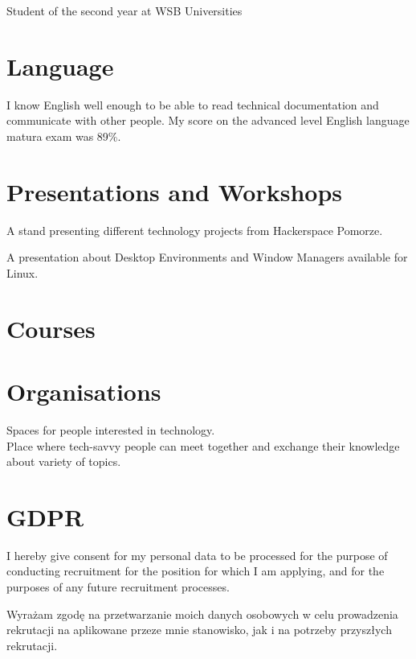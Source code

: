 \documentclass[11pt, a4paper, sans, colorlinks]{moderncv}
\begin{document}
{Student of the second year at WSB Universities}

\section{Language}

{I know English well enough to be able to read technical documentation and communicate with other people. My score on the advanced level English language matura exam was 89\%. }


\section{Presentations and Workshops}

{}{}
{A stand presenting different technology projects from Hackerspace Pomorze.}

{}{}
{A presentation about Desktop Environments and Window Managers available for Linux.}

\section{Courses}


\section{Organisations}

{
Spaces for people interested in technology.\\
Place where tech-savvy people can meet together and exchange their knowledge about variety of topics.
}

\section{GDPR}

{I hereby give consent for my personal data to be processed for the purpose of conducting recruitment for the position for which I am applying, and for the purposes of any future recruitment processes.}

{Wyrażam zgodę na przetwarzanie moich danych osobowych w celu prowadzenia rekrutacji na aplikowane przeze mnie stanowisko, jak i na potrzeby przyszłych rekrutacji.}
\end{document}
